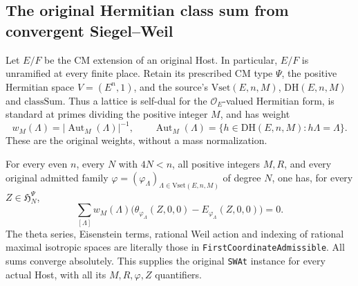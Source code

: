 \subsection{The original Hermitian class sum from convergent Siegel--Weil}
\label{actual-hermitian-siegel-weil}

Let $E/F$ be the CM extension of an original Host. In particular,
$E/F$ is unramified at every finite place. Retain its prescribed CM
type $\Psi$, the positive Hermitian space $V=(E^n,1)$, and the
source's $\mathrm{Vset}(E,n,M)$, $\mathrm{DH}(E,n,M)$ and
$\mathrm{classSum}$. Thus a lattice is self-dual for the
$\mathcal O_E$-valued Hermitian form, is standard at primes
dividing the positive integer $M$, and has weight
\[
 w_M(\Lambda)=|\operatorname{Aut}_M(\Lambda)|^{-1},\qquad
 \operatorname{Aut}_M(\Lambda)=
 \{h\in\mathrm{DH}(E,n,M):h\Lambda=\Lambda\}.
\]
These are the original weights, without a mass normalization.

\begin{theorem}\label{actual-hermitian-siegel-weil-theorem}
For every even $n$, every $N$ with $4N<n$, all positive integers
$M,R$, and every original admitted family
$\varphi=(\varphi_\Lambda)_{\Lambda\in\mathrm{Vset}(E,n,M)}$
of degree $N$, one has, for every $Z\in\mathfrak H_N^\Psi$,
\begin{equation}\label{actual-sw-class-identity}
 \sum_{[\Lambda]}w_M(\Lambda)
 \bigl(\theta_{\varphi_\Lambda}(Z,0,0)
                   -E_{\varphi_\Lambda}(Z,0,0)\bigr)=0.
\end{equation}
The theta series, Eisenstein terms, rational Weil action and
indexing of rational maximal isotropic spaces are literally those
in \texttt{FirstCoordinateAdmissible}. All sums converge absolutely.
This supplies the original \texttt{SWAt} instance for every
actual Host, with all its $M,R,\varphi,Z$ quantifiers.
\end{theorem}

